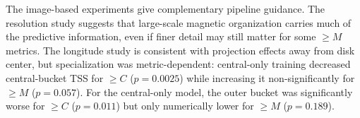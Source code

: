 \documentclass[runningheads]{llncs}
\begin{document}
The image-based experiments give complementary pipeline guidance. The resolution study suggests that large-scale magnetic organization carries much of the predictive information, even if finer detail may still matter for some $\geq M$ metrics. The longitude study is consistent with projection effects away from disk center, but specialization was metric-dependent: central-only training decreased central-bucket TSS for $\geq C$ ($p=0.0025$) while increasing it non-significantly for $\geq M$ ($p=0.057$). For the central-only model, the outer bucket was significantly worse for $\geq C$ ($p=0.011$) but only numerically lower for $\geq M$ ($p=0.189$).


\end{document}
